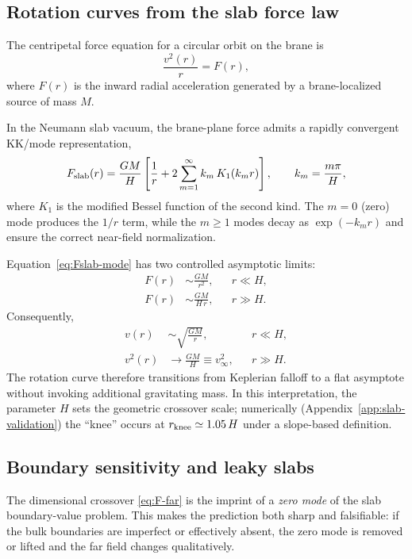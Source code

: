 \documentclass[12pt]{article}
\begin{document}
\subsection{Rotation curves from the slab force law}
The centripetal force equation for a circular orbit on the brane is
\begin{equation}
  \frac{v^2(r)}{r} = F(r),
\end{equation}
where $F(r)$ is the inward radial acceleration generated by a brane-localized source of mass $M$.

In the Neumann slab vacuum, the brane-plane force admits a rapidly convergent KK/mode representation,
\begin{equation}
  F_{\rm slab}(r)
  = \frac{GM}{H}\left[\frac{1}{r}
    +2\sum_{m=1}^{\infty} k_m\,K_1(k_m r)\right],
  \qquad
  k_m=\frac{m\pi}{H},
  \label{eq:Fslab-mode}
\end{equation}
where $K_1$ is the modified Bessel function of the second kind. The $m=0$ (zero) mode produces the $1/r$ term, while the $m\ge 1$ modes decay as $\exp(-k_m r)$ and ensure the correct near-field normalization.

Equation~\eqref{eq:Fslab-mode} has two controlled asymptotic limits:
\begin{align}
  F(r) &\sim \frac{GM}{r^2},
  && r\ll H,
  \label{eq:F-near}\\
  F(r) &\sim \frac{GM}{H\,r},
  && r\gg H.
  \label{eq:F-far}
\end{align}
Consequently,
\begin{align}
  v(r) &\sim \sqrt{\frac{GM}{r}},
  && r\ll H,
  \\
  v^2(r) &\to \frac{GM}{H}\equiv v_\infty^2,
  && r\gg H.
  \label{eq:vflat}
\end{align}
The rotation curve therefore transitions from Keplerian falloff to a flat asymptote without invoking additional gravitating mass. In this interpretation, the parameter $H$ sets the geometric crossover scale; numerically (Appendix~\ref{app:slab-validation}) the ``knee'' occurs at $r_{\rm knee}\simeq 1.05\,H$ under a slope-based definition.

\subsection{Boundary sensitivity and leaky slabs}
\label{subsec:leaky}

The dimensional crossover \eqref{eq:F-far} is the imprint of a \emph{zero mode} of the slab boundary-value problem. This makes the prediction both sharp and falsifiable: if the bulk boundaries are imperfect or effectively absent, the zero mode is removed or lifted and the far field changes qualitatively.
\end{document}
